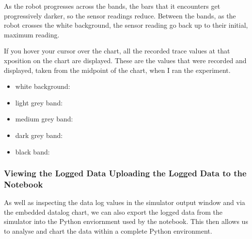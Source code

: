 \documentclass[letterpaper,10pt,english]{sphinxmanual}
\begin{document}
As the robot progresses across the bands, the bars that it encounters get progressively darker, so the sensor readings reduce. Between the bands, as the robot crosses the white background, the sensor reading go back up to their initial, maximum reading.

If you hover your cursor over the chart, all the recorded trace values at that x\sphinxhyphen{}position on the chart are displayed. These are the values that were recorded and displayed, taken from the midpoint of the chart, when I ran the experiment.
\begin{itemize}
\item {} 
white background: 

\item {} 
light grey band: 

\item {} 
medium grey band: 

\item {} 
dark grey band: 

\item {} 
black band: 

\end{itemize}





\subsubsection{Viewing the Logged Data \sphinxhyphen{} Uploading the Logged Data to the Notebook}
\label{\detokenize{content/00_SOFTWARE_GUIDE/Section_00_03_quick_practical_tour:Viewing-the-Logged-Data---Uploading-the-Logged-Data-to-the-Notebook}}
As well as inspecting the data log values in the simulator output window and via the embedded datalog chart, we can also export the logged data from the simulator into the Python enviornment used by the notebook. This then allows us to analyse and chart the data within a complete Python environment.
\end{document}
